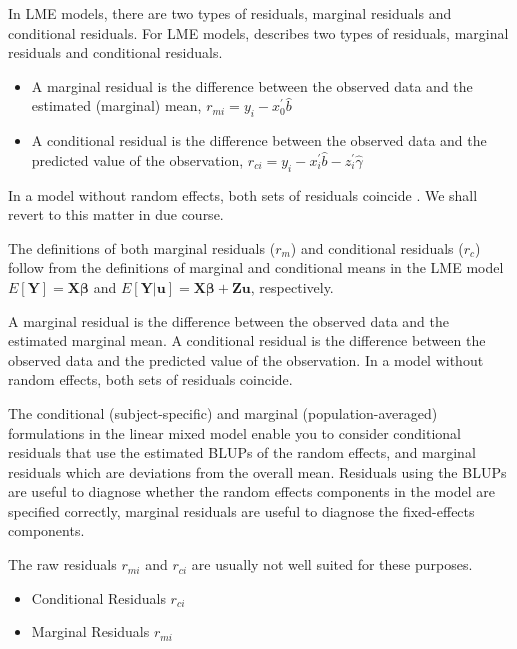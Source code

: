 \documentclass[12pt, a4paper]{report}
\theoremstyle{plain}
\theoremstyle{definition}
\theoremstyle{remark}
\begin{document}
	In LME models, there are two types
	of residuals, marginal residuals and conditional residuals. 
	For LME models, \citet{schab} describes two types of residuals, marginal residuals and conditional residuals. 
	
	\begin{itemize}
		\item A marginal residual is the difference between the observed data and the estimated (marginal) mean, $r_{mi} = y_i - x_0^{\prime} \hat{b}$
		\item A conditional residual is the difference between the observed data and the predicted value of the observation,
		$r_{ci} = y_i - x_i^{\prime} \hat{b} - z_i^{\prime} \hat{\gamma}$	
	\end{itemize} 
	In a model without random effects, both sets of
	residuals coincide \citep{schabenberger}. We shall revert to this matter in due course.
	
	
	
	
	
	The definitions of both marginal residuals ($r_m$) and conditional residuals ($r_c$) follow from the definitions of marginal and conditional means in the LME model 
	$E[\boldsymbol{Y}] = \boldsymbol{X}\boldsymbol{\beta}$ and $E[\boldsymbol{Y|\boldsymbol{u}}] = \boldsymbol{X}\boldsymbol{\beta} + \boldsymbol{Z}\boldsymbol{u}$, respectively.
	
	A marginal residual is the difference between the observed data and the estimated marginal mean. A conditional residual is the difference between the observed data and the predicted value of the observation. In a model without random effects, both sets of	residuals coincide.
	
	
	The conditional (subject-specific) and marginal (population-averaged) formulations in the linear mixed model enable you to consider conditional residuals that use the estimated BLUPs of the random effects, and marginal residuals which are deviations from the overall mean. Residuals using the BLUPs are useful to diagnose whether the random effects components
	in the model are specified correctly, marginal residuals are useful to diagnose the fixed-effects components.	
	
	
	The raw residuals $r_{mi}$ and $r_{ci}$ are usually not well suited for these purposes.
	
	\begin{itemize}
		\item Conditional Residuals $r_{ci}$
		\item Marginal Residuals $r_{mi}$
	\end{itemize}
	
\end{document}
